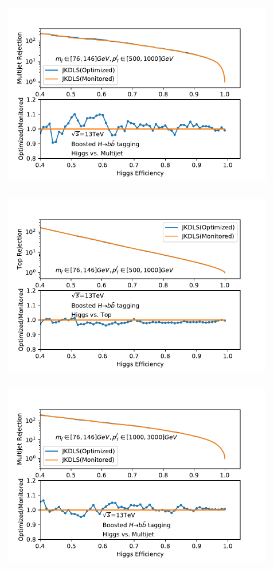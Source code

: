 \begin{figure}[htbp]
\begin{subfigure}{.5\textwidth}
    \caption{}
   \label{fig:}
  \end{subfigure}
 \newline 
   \begin{subfigure}{.5\textwidth}
  \centering
   \includegraphics[width=0.75\textwidth]{figuresXbb/OPT/OPTQCDMASSPT2.pdf}
    \caption{}
   \label{fig:}
  \end{subfigure}
  \begin{subfigure}{.5\textwidth}
  \centering
   \includegraphics[width=0.75\textwidth]{figuresXbb/OPT/OPTopMASSPT2.pdf}
    \caption{}
   \label{fig:}
  \end{subfigure}
 \newline 
   \begin{subfigure}{.5\textwidth}
  \centering
   \includegraphics[width=0.75\textwidth]{figuresXbb/OPT/OPTQCDMASSPT3.pdf}

\end{subfigure}
\end{figure}
